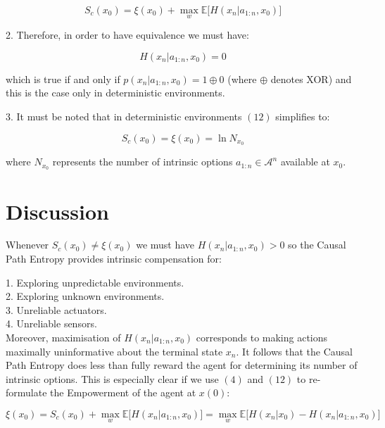 \documentclass{article}
\begin{document}
\begin{equation}
S_c(x_0) = \xi(x_0)  + \max\limits_{w} \mathbb{E} \big[H(x_n|a_{1:n},x_0)\big]
\end{equation}

2. Therefore, in order to have equivalence we must have:

\begin{equation}
H(x_n|a_{1:n},x_0) = 0
\end{equation}

which is true if and only if $p(x_n|a_{1:n},x_0) = 1 \oplus 0$ (where $\oplus$ denotes XOR) and this is the case only in deterministic environments. 

3. It must be noted that in deterministic environments $(12)$ simplifies to:

\begin{equation}
S_c(x_0) = \xi(x_0)  = \ln N_{x_0}
\end{equation}

where $N_{x_0}$ represents the number of intrinsic options $a_{1:n} \in \mathcal{A}^n$ available at $x_0$. 

\section{Discussion}

Whenever $S_c(x_0) \neq \xi(x_0)$ we must have $H(x_n|a_{1:n},x_0) > 0$ so the Causal Path Entropy provides intrinsic compensation for:

1. Exploring unpredictable environments. \\
2. Exploring unknown environments. \\
3. Unreliable actuators. \\
4. Unreliable sensors. \\

Moreover, maximisation of $H(x_n|a_{1:n},x_0)$ corresponds to making actions maximally uninformative about the terminal state $x_n$. It follows that the Causal Path Entropy does less than fully reward the agent for determining its number of intrinsic options. This is especially clear if we use $(4)$ and $(12)$ to re-formulate the Empowerment of the agent at $x(0)$:

\begin{equation}
\xi(x_0) = S_c(x_0)  + \max\limits_{w} \mathbb{E} \big[H(x_n|a_{1:n},x_0)\big] =  \max\limits_{w} \mathbb{E} \big[H(x_n|x_0) -H(x_n|a_{1:n},x_0)\big]
\end{equation}
\end{document}
